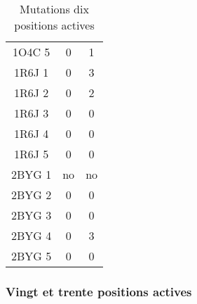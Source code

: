 \begin{table}[h]
\begin{tabular}{ccc}
        1O4C 5 & 0  & 1 \\
        1R6J 1 & 0  & 3 \\
        1R6J 2 & 0  & 2 \\
        1R6J 3 & 0  & 0 \\
        1R6J 4 & 0  & 0 \\
        1R6J 5 & 0  & 0 \\
        2BYG 1 & no & no \\ 
        2BYG 2 & 0  & 0 \\
        2BYG 3 & 0  & 0 \\
        2BYG 4 & 0  & 3 \\
        2BYG 5 & 0  & 0 \\        
        \bottomrule

 \end{tabular}      
 \caption{Mutations dix positions actives }
\label{tab:mutations_10_actives}
\end{table}

   \subsubsection{Vingt et trente positions actives}


